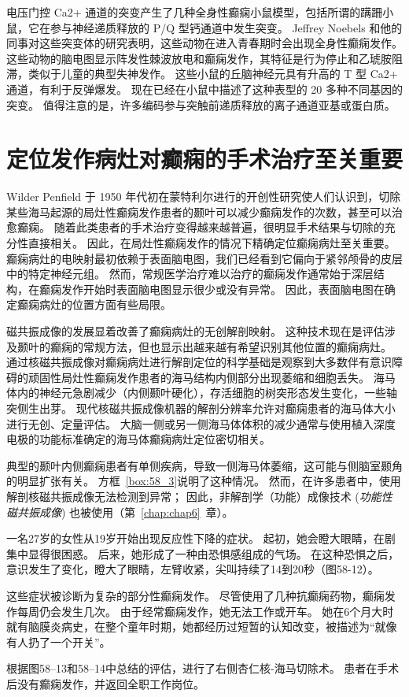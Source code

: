 电压门控 Ca2+ 通道的突变产生了几种全身性癫痫小鼠模型，包括所谓的蹒跚小鼠，它在参与神经递质释放的 P/Q 型钙通道中发生突变。
Jeffrey Noebels 和他的同事对这些突变体的研究表明，这些动物在进入青春期时会出现全身性癫痫发作。
这些动物的脑电图显示阵发性棘波放电和癫痫发作，其特征是行为停止和乙琥胺阻滞，类似于儿童的典型失神发作。
这些小鼠的丘脑神经元具有升高的 T 型 Ca2+ 通道，有利于反弹爆发。
现在已经在小鼠中描述了这种表型的 20 多种不同基因的突变。
值得注意的是，许多编码参与突触前递质释放的离子通道亚基或蛋白质。



\section{定位发作病灶对癫痫的手术治疗至关重要}

Wilder Penfield 于 1950 年代初在蒙特利尔进行的开创性研究使人们认识到，切除某些海马起源的局灶性癫痫发作患者的颞叶可以减少癫痫发作的次数，甚至可以治愈癫痫。
随着此类患者的手术治疗变得越来越普遍，很明显手术结果与切除的充分性直接相关。
因此，在局灶性癫痫发作的情况下精确定位癫痫病灶至关重要。
癫痫病灶的电映射最初依赖于表面脑电图，我们已经看到它偏向于紧邻颅骨的皮层中的特定神经元组。
然而，常规医学治疗难以治疗的癫痫发作通常始于深层结构，在癫痫发作开始时表面脑电图显示很少或没有异常。
因此，表面脑电图在确定癫痫病灶的位置方面有些局限。



磁共振成像的发展显着改善了癫痫病灶的无创解剖映射。
这种技术现在是评估涉及颞叶的癫痫的常规方法，但也显示出越来越有希望识别其他位置的癫痫病灶。
通过核磁共振成像对癫痫病灶进行解剖定位的科学基础是观察到大多数伴有意识障碍的顽固性局灶性癫痫发作患者的海马结构内侧部分出现萎缩和细胞丢失。
海马体内的神经元急剧减少（内侧颞叶硬化），存活细胞的树突形态发生变化，一些轴突侧生出芽。
现代核磁共振成像机器的解剖分辨率允许对癫痫患者的海马体大小进行无创、定量评估。
大脑一侧或另一侧海马体体积的减少通常与使用植入深度电极的功能标准确定的海马体癫痫病灶定位密切相关。


典型的颞叶内侧癫痫患者有单侧疾病，导致一侧海马体萎缩，这可能与侧脑室颞角的明显扩张有关。
方框~\ref{box:58_3}说明了这种情况。
然而，在许多患者中，使用解剖核磁共振成像无法检测到异常；
因此，非解剖学（功能）成像技术 (\textit{功能性磁共振成像}) 也被使用（第~\ref{chap:chap6}~章）。


\begin{proposition}[神经解剖学导航术语] \label{box:58_3}
	
	\quad \quad 一名27岁的女性从19岁开始出现反应性下降的症状。
	起初，她会瞪大眼睛，在剧集中显得很困惑。
	后来，她形成了一种由恐惧感组成的气场。
	在这种恐惧之后，意识发生了变化，瞪大了眼睛，左臂收紧，尖叫持续了14到20秒（图58-12）。
	
	\quad \quad 这些症状被诊断为复杂的部分性癫痫发作。
	尽管使用了几种抗癫痫药物，癫痫发作每周仍会发生几次。
	由于经常癫痫发作，她无法工作或开车。
	她在6个月大时就有脑膜炎病史，在整个童年时期，她都经历过短暂的认知改变，被描述为“就像有人扔了一个开关”。
	
	\quad \quad 根据图58–13和58–14中总结的评估，进行了右侧杏仁核-海马切除术。
	患者在手术后没有癫痫发作，并返回全职工作岗位。
	
\end{proposition}


